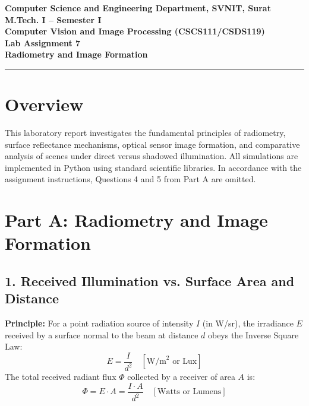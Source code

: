 \documentclass[12pt]{article}
\begin{document}

\begin{center}
\textbf{Computer Science and Engineering Department, SVNIT, Surat}\\
\textbf{M.Tech. I -- Semester I}\\
\textbf{Computer Vision and Image Processing (CSCS111/CSDS119)}\\
\textbf{Lab Assignment 7}\\
\textbf{Radiometry and Image Formation}
\end{center}
\vspace{-4pt}
\hrule
\vspace{6pt}

\section*{Overview}
This laboratory report investigates the fundamental principles of radiometry, surface reflectance mechanisms, optical sensor image formation, and comparative analysis of scenes under direct versus shadowed illumination. All simulations are implemented in Python using standard scientific libraries. In accordance with the assignment instructions, Questions 4 and 5 from Part A are omitted.

\section*{Part A: Radiometry and Image Formation}

\subsection*{1. Received Illumination vs. Surface Area and Distance}
\textbf{Principle:} For a point radiation source of intensity $I$ (in W/sr), the irradiance $E$ received by a surface normal to the beam at distance $d$ obeys the Inverse Square Law:
\begin{equation}
E = \frac{I}{d^2} \quad [\text{W/m}^2 \text{ or Lux}]
\end{equation}
The total received radiant flux $\Phi$ collected by a receiver of area $A$ is:
\begin{equation}
\Phi = E \cdot A = \frac{I \cdot A}{d^2} \quad [\text{Watts or Lumens}]
\end{equation}
\end{document}
